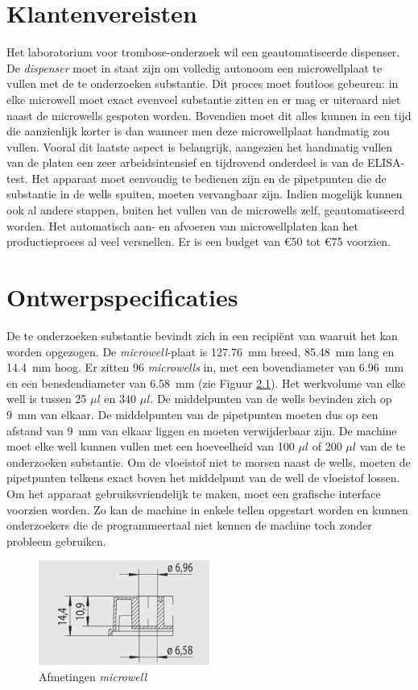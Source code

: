 \documentclass[a4paper,twoside,kulak]{kulakreport} %
\begin{document}
\chapter{Klantenvereisten}
Het laboratorium voor trombose-onderzoek wil een geautomatiseerde dispenser. De \textit{dispenser} moet in staat zijn om volledig autonoom een microwellplaat te vullen met de te onderzoeken substantie. Dit proces moet foutloos gebeuren: in elke microwell moet exact evenveel substantie zitten en er mag er uiteraard niet naast de microwells gespoten worden. Bovendien moet dit alles kunnen in een tijd die aanzienlijk korter is dan wanneer men deze microwellplaat handmatig zou vullen. Vooral dit laatste aspect is belangrijk, aangezien het handmatig vullen van de platen een zeer arbeidsintensief en tijdrovend onderdeel is van de ELISA-test. Het apparaat moet eenvoudig te bedienen zijn en de pipetpunten die de substantie in de wells spuiten, moeten vervangbaar zijn.  Indien mogelijk kunnen ook al andere stappen, buiten het vullen van de microwells zelf, geautomatiseerd worden. Het automatisch aan- en afvoeren van microwellplaten kan het productieproces al veel versnellen. Er is een budget van \euro 50 tot \euro 75 voorzien.
\chapter{Ontwerpspecificaties}
De te onderzoeken substantie bevindt zich in een recipiënt van waaruit het kan worden opgezogen. De \textit{microwell}-plaat is \SI{127.76}{mm} breed, \SI{85.48}{mm} lang en \SI{14.4}{mm} hoog. Er zitten 96 \textit{microwells} in, met een bovendiameter van \SI{6.96}{mm} en een benedendiameter van \SI{6.58}{mm} (zie Figuur \ref{fig: afmetingenMicrowellplaat}). Het werkvolume van elke well is tussen 25 $\mu l$ en 340 $\mu l$. De middelpunten van de wells bevinden zich op \SI{9}{mm} van elkaar. De middelpunten van de pipetpunten moeten dus op een afstand van \SI{9}{mm} van elkaar liggen en moeten verwijderbaar zijn. De machine moet elke well kunnen vullen met een hoeveelheid van 100 $\mu l$ of 200 $\mu l$ van de te onderzoeken substantie. Om de vloeistof niet te morsen naast de wells, moeten de pipetpunten telkens exact boven het middelpunt van de well de vloeistof lossen. Om het apparaat gebruiksvriendelijk te maken, moet een grafische interface voorzien worden. Zo kan de machine in enkele tellen opgestart worden en kunnen onderzoekers die de programmeertaal niet kennen de machine toch zonder probleem gebruiken.

\begin{figure}[h]
	\centering
	\includegraphics[width=0.5\textwidth]{AfmetingenMicrowell.png}
	\caption{Afmetingen \textit{microwell}}
	\label{fig: afmetingenMicrowellplaat}
	
\end{figure} 
\end{document}
